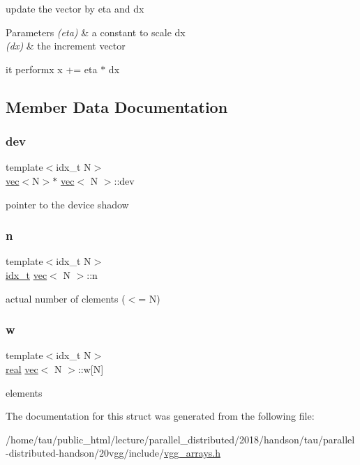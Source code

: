 update the vector by eta and dx 


\begin{DoxyParams}{Parameters}
{\em (eta)} & a constant to scale dx \\
\hline
{\em (dx)} & the increment vector\\
\hline
\end{DoxyParams}
it performx x += eta $\ast$ dx 

\subsection{Member Data Documentation}
\mbox{\label{structvec_a8ea19d04a43f99871fcf4bff8b5b25b2}} 
\subsubsection{\texorpdfstring{dev}{dev}}
{\footnotesize\ttfamily template$<$idx\+\_\+t N$>$ \\
\hyperlink{structvec}{vec}$<$N$>$$\ast$ \hyperlink{structvec}{vec}$<$ N $>$\+::dev}

pointer to the device shadow \mbox{\label{structvec_a8e2947aa75530f74cac781347dd97e98}} 
\subsubsection{\texorpdfstring{n}{n}}
{\footnotesize\ttfamily template$<$idx\+\_\+t N$>$ \\
\hyperlink{vgg__util_8h_a8e93478a00e685bea5e6a3f617bf03a3}{idx\+\_\+t} \hyperlink{structvec}{vec}$<$ N $>$\+::n}

actual number of clements ($<$= N) \mbox{\label{structvec_a3aa2e8ed9a81937b8527eaef24d4437d}} 
\subsubsection{\texorpdfstring{w}{w}}
{\footnotesize\ttfamily template$<$idx\+\_\+t N$>$ \\
\hyperlink{vgg__util_8h_a1082d08aaa761215ec83e7149f27ad16}{real} \hyperlink{structvec}{vec}$<$ N $>$\+::w\mbox{[}N\mbox{]}}

elements 

The documentation for this struct was generated from the following file\+:\begin{DoxyCompactItemize}
\item 
/home/tau/public\+\_\+html/lecture/parallel\+\_\+distributed/2018/handson/tau/parallel-\/distributed-\/handson/20vgg/include/\hyperlink{vgg__arrays_8h}{vgg\+\_\+arrays.\+h}\end{DoxyCompactItemize}
